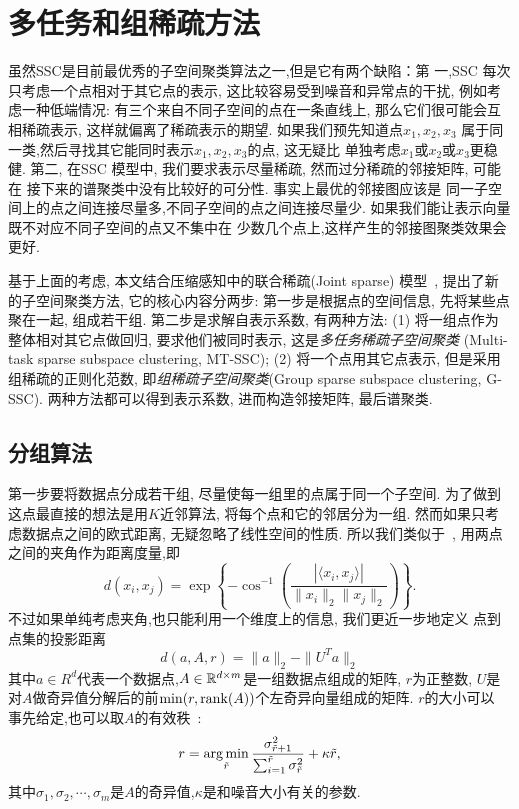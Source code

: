 \chapter{多任务和组稀疏方法}\label{chp:prob_setup}
虽然SSC是目前最优秀的子空间聚类算法之一,但是它有两个缺陷：第
一,SSC 每次只考虑一个点相对于其它点的表示,
这比较容易受到噪音和异常点的干扰, 例如考虑一种低端情况:
有三个来自不同子空间的点在一条直线上, 那么它们很可能会互相稀疏表示,
这样就偏离了稀疏表示的期望.
如果我们预先知道点\(x_1, x_2, x_3\)
属于同一类,然后寻找其它能同时表示\(x_1, x_2, x_3\)的点, 这无疑比
单独考虑\(x_1\)或\(x_2\)或\(x_3\)更稳健. 第二, 在SSC 模型中,
我们要求表示尽量稀疏, 然而过分稀疏的邻接矩阵, 可能在
接下来的谱聚类中没有比较好的可分性. 事实上最优的邻接图应该是
同一子空间上的点之间连接尽量多,不同子空间的点之间连接尽量少.
如果我们能让表示向量既不对应不同子空间的点又不集中在
少数几个点上,这样产生的邻接图聚类效果会更好.

基于上面的考虑, 本文结合压缩感知中的联合稀疏(Joint sparse) 模型~\cite{yuan2012visual},
提出了新的子空间聚类方法, 它的核心内容分两步:
第一步是根据点的空间信息, 先将某些点聚在一起, 组成若干组.
第二步是求解自表示系数, 有两种方法:
(1) 将一组点作为整体相对其它点做回归,
要求他们被同时表示, 这是\emph{多任务稀疏子空间聚类}
(Multi-task sparse subspace clustering, MT-SSC);
(2) 将一个点用其它点表示, 但是采用组稀疏的正则化范数,
即\emph{组稀疏子空间聚类}(Group sparse subspace clustering, G-SSC).
两种方法都可以得到表示系数, 进而构造邻接矩阵, 最后谱聚类.

\section{分组算法} 
第一步要将数据点分成若干组, 尽量使每一组里的点属于同一个子空间.
为了做到这点最直接的想法是用\(K\)近邻算法, 将每个点和它的邻居分为一组.
然而如果只考虑数据点之间的欧式距离, 无疑忽略了线性空间的性质.
所以我们类似于~\cite{heckel2013noisy}, 用两点之间的夹角作为距离度量,即
\[d(x_i,x_j)=\exp\left\{-\cos^{-1}\left( \frac{|\langle x_i,
x_j\rangle|}{\|x_i\|_2\|x_j\|_2} \right)\right\}.\]
不过如果单纯考虑夹角,也只能利用一个维度上的信息, 我们更近一步地定义
点到点集的投影距离
\[ d(a, A, r) =  \|a\|_2-\|U^Ta\|_2 \]
其中\(a \in R^d\)代表一个数据点,\(A\in \mathbb{R}^{d\times m}\)是一组数据点组成的矩阵,
\(r\)为正整数, \(U\)是对\(A\)做奇异值分解后的前\(\min(r, \operatorname{rank}(A))\)个左奇异向量组成的矩阵.
\(r\)的大小可以
事先给定,也可以取\(A\)的有效秩~\cite{yan2006general}:
\[
  r = \operatorname*{arg\,min}_{\tilde{r}} \frac{\sigma_{\tilde{r}+1}^2}{\sum_{i=1}^{\tilde{r}}
  \sigma_{\tilde{r}}^2} +\kappa \tilde{r},
\]
其中\(\sigma_1,\sigma_2,\cdots,\sigma_m\)是\(A\)的奇异值,\(\kappa\)是和噪音大小有关的参数.

